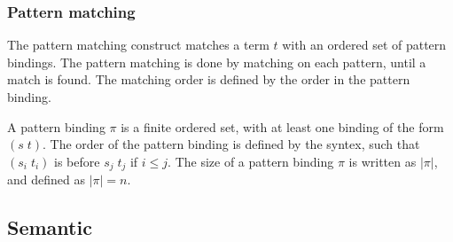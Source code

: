 \documentclass[../../master.tex]{subfiles}
\begin{document}
\subsubsection{Pattern matching}
The pattern matching construct matches a term $t$ with an ordered set of pattern bindings.
The pattern matching is done by matching on each pattern, until a match is found.
The matching order is defined by the order in the pattern binding.

A pattern binding $\pi$ is a finite ordered set, with at least one binding of the form $(s\;t)$.
The order of the pattern binding is defined by the syntex, such that $(s_i\;t_i)$ is before $s_j\;t_j$ if $i\leq j$.
The size of a pattern binding $\pi$ is written as $|\pi|$, and defined as $|\pi| = n$.

\subsection{Semantic}
\end{document}
